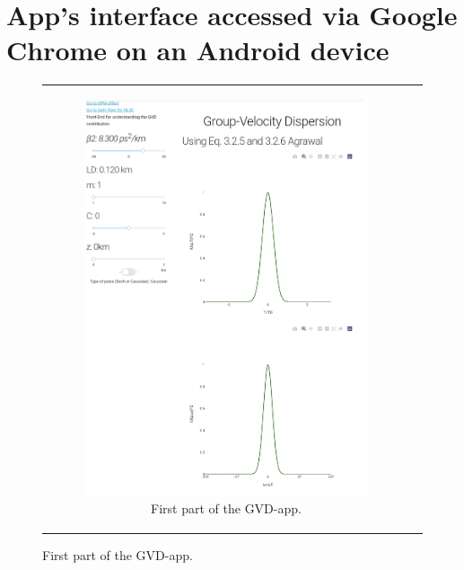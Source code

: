 \section{App's interface accessed via Google Chrome on an Android device}
 \label{Appendixapp}

        
        
        \begin{figure}[label={fig:herokugvd}, caption={GVD-App accesed via Google Chrome in an Android device.}]
        \centering
        \begin{tabular}[c]{cc}
        \centering
        \begin{subfigure}[b]{.53\textwidth}
		    \centering	
            \includegraphics[width=1\textwidth]{figures/chap4/android_gvd1.png}
            \caption{First part of the GVD-app.}
            \label{fig:herokugvd1}
        \end{subfigure}

\end{tabular}
\end{figure}
